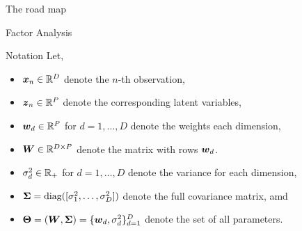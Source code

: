 \documentclass[aspectratio=169]{beamer}
\begin{document}
\begin{frame}{The road map}
\end{frame}

\begin{frame}{Factor Analysis}



\end{frame}

\begin{frame}{Notation}
Let,
\begin{itemize}
    \item $\boldsymbol{x}_n \in \mathbb{R}^D$ denote the $n$-th observation,
    \item $\boldsymbol{z}_n \in \mathbb{R}^P$ denote the corresponding latent variables,
    \item $\boldsymbol{w}_d \in \mathbb{R}^{P}$ for $d=1,\ldots,D$ denote the weights each dimension,
    \item $\boldsymbol{W} \in \mathbb{R}^{D \times P}$ denote the matrix with rows $\boldsymbol{w}_d$.
    \item $\sigma_d^2 \in \mathbb{R}_+$ for $d=1,\ldots,D$ denote the variance for each dimension, 
    \item $\boldsymbol{\Sigma} = \textrm{diag}([\sigma_1^2, \ldots, \sigma_D^2])$ denote the full covariance matrix, amd
    \item $\boldsymbol{\Theta} = (\boldsymbol{W}, \boldsymbol{\Sigma}) = \{\boldsymbol{w}_d, \sigma_d^2\}_{d=1}^D$ denote the set of all parameters.
\end{itemize}
\end{frame}
\end{document}
